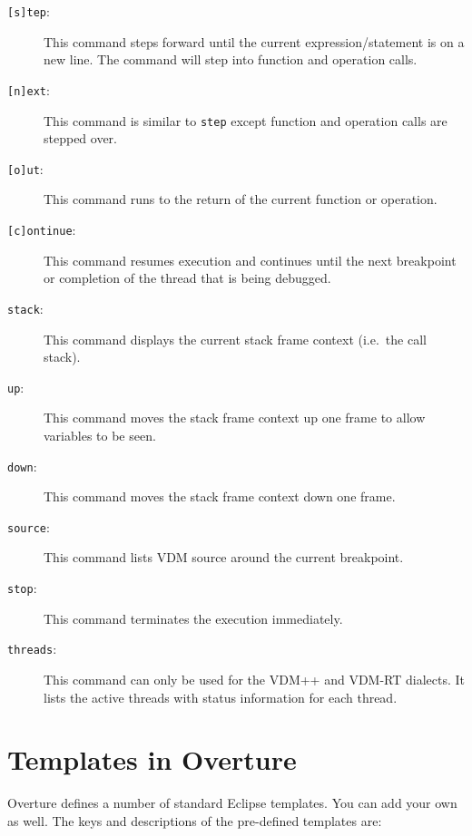 \documentclass{overturerepchap}
\begin{document}
\begin{description}
\item[\texttt{[s]tep}:] This command steps forward until the
  current expression/statement is on a new line. The command will step
  into function and operation calls.
\item[\texttt{[n]ext}:] This command is similar to \texttt{step} except
 function and operation calls are stepped over.
\item[\texttt{[o]ut}:] This command runs to the return of the current
  function or operation.
\item[\texttt{[c]ontinue}:] This command resumes execution and continues
  until the next breakpoint or completion of the thread that is being
  debugged.
\item[\texttt{stack}:] This command displays the current stack frame
  context (i.e.\ the call stack).
\item[\texttt{up}:] This command moves the stack frame context up one
  frame to allow variables to be seen.
\item[\texttt{down}:] This command moves the stack frame context down
  one frame.
\item[\texttt{source}:] This command lists VDM source around the
  current breakpoint. 
\item[\texttt{stop}:] This command terminates the execution
  immediately.
\item[\texttt{threads}:] This command can only be used for the VDM++
  and VDM-RT dialects. It lists the active threads with status
  information for each thread.
\end{description}

\appendix
\newpage





\newpage
\chapter{Templates in Overture}\label{app:templates}

Overture defines a number of standard Eclipse templates. You can add
your own as well. The keys and descriptions of the pre-defined templates
are:
\end{document}
